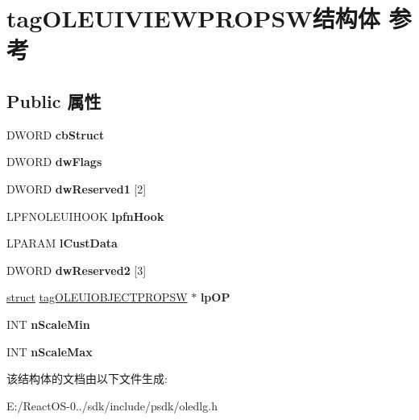 \hypertarget{structtag_o_l_e_u_i_v_i_e_w_p_r_o_p_s_w}{}\section{tag\+O\+L\+E\+U\+I\+V\+I\+E\+W\+P\+R\+O\+P\+S\+W结构体 参考}
\label{structtag_o_l_e_u_i_v_i_e_w_p_r_o_p_s_w}
\subsection*{Public 属性}
\begin{DoxyCompactItemize}
\item 
\mbox{\label{structtag_o_l_e_u_i_v_i_e_w_p_r_o_p_s_w_afac04e3a3179a9dc709f8f1edcdda566}} 
D\+W\+O\+RD {\bfseries cb\+Struct}
\item 
\mbox{\label{structtag_o_l_e_u_i_v_i_e_w_p_r_o_p_s_w_a51a5c5ed61b6f1880990dd7e93f45adf}} 
D\+W\+O\+RD {\bfseries dw\+Flags}
\item 
\mbox{\label{structtag_o_l_e_u_i_v_i_e_w_p_r_o_p_s_w_a7ada47fadb94ca0b1e5c98db0b987663}} 
D\+W\+O\+RD {\bfseries dw\+Reserved1} \mbox{[}2\mbox{]}
\item 
\mbox{\label{structtag_o_l_e_u_i_v_i_e_w_p_r_o_p_s_w_aab59e9cacdd16f853dcad4236d87b12b}} 
L\+P\+F\+N\+O\+L\+E\+U\+I\+H\+O\+OK {\bfseries lpfn\+Hook}
\item 
\mbox{\label{structtag_o_l_e_u_i_v_i_e_w_p_r_o_p_s_w_a85d564817350e2c147f38d9ed0f3f40b}} 
L\+P\+A\+R\+AM {\bfseries l\+Cust\+Data}
\item 
\mbox{\label{structtag_o_l_e_u_i_v_i_e_w_p_r_o_p_s_w_a864042b746f512607f0ea286ea142d65}} 
D\+W\+O\+RD {\bfseries dw\+Reserved2} \mbox{[}3\mbox{]}
\item 
\mbox{\label{structtag_o_l_e_u_i_v_i_e_w_p_r_o_p_s_w_a9a357c80351a43bd6dcc74aa4160b0a7}} 
\hyperlink{interfacestruct}{struct} \hyperlink{structtag_o_l_e_u_i_o_b_j_e_c_t_p_r_o_p_s_w}{tag\+O\+L\+E\+U\+I\+O\+B\+J\+E\+C\+T\+P\+R\+O\+P\+SW} $\ast$ {\bfseries lp\+OP}
\item 
\mbox{\label{structtag_o_l_e_u_i_v_i_e_w_p_r_o_p_s_w_aa1c39c209e8e5b35fd93026012ce0806}} 
I\+NT {\bfseries n\+Scale\+Min}
\item 
\mbox{\label{structtag_o_l_e_u_i_v_i_e_w_p_r_o_p_s_w_a95ac4e9117643fb510b52fc0c6cd4220}} 
I\+NT {\bfseries n\+Scale\+Max}
\end{DoxyCompactItemize}


该结构体的文档由以下文件生成\+:\begin{DoxyCompactItemize}
\item 
E\+:/\+React\+O\+S-\/0../sdk/include/psdk/oledlg.\+h\end{DoxyCompactItemize}
